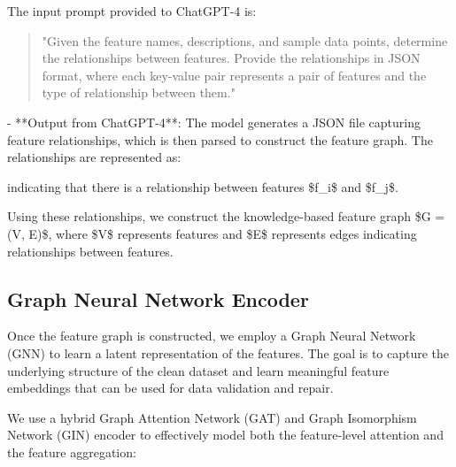   The input prompt provided to ChatGPT-4 is:
  \begin{quote}
  "Given the feature names, descriptions, and sample data points, determine the relationships between features. Provide the relationships in JSON format, where each key-value pair represents a pair of features and the type of relationship between them."
  \end{quote}

- **Output from ChatGPT-4**: The model generates a JSON file capturing feature relationships, which is then parsed to construct the feature graph. The relationships are represented as:

  indicating that there is a relationship between features \$f\_i\$ and \$f\_j\$.

Using these relationships, we construct the knowledge-based feature graph \$G = (V, E)\$, where \$V\$ represents features and \$E\$ represents edges indicating relationships between features.

\subsection{Graph Neural Network Encoder}

Once the feature graph is constructed, we employ a Graph Neural Network (GNN) to learn a latent representation of the features. The goal is to capture the underlying structure of the clean dataset and learn meaningful feature embeddings that can be used for data validation and repair.

We use a hybrid Graph Attention Network (GAT) and Graph Isomorphism Network (GIN) encoder to effectively model both the feature-level attention and the feature aggregation:

